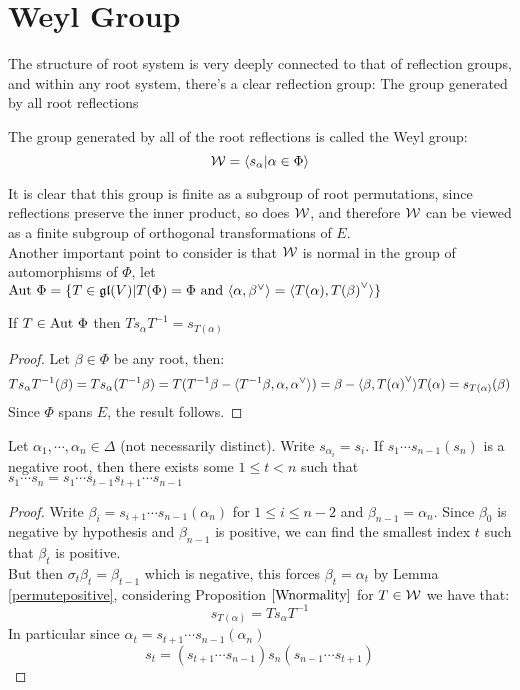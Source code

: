 \section{Weyl Group}
The structure of root system is very deeply connected to that of reflection groups, and within any root system, there's a clear reflection group: The group generated by all root reflections
\begin{defi}
	The group generated by all of the root reflections is called the Weyl group:
	$$ \mathcal{W} = \langle s_\alpha | \alpha \in \Phi\rangle $$
	\label{Wdef}
\end{defi}
It is clear that this group is finite as a subgroup of root permutations, since reflections preserve the inner product, so does $\mathcal{W}$, and therefore $\mathcal{W}$ can be viewed as a finite subgroup of orthogonal transformations of $E$.\\
Another important point to consider is that $\mathcal{W}$ is normal in the group of automorphisms of $\Phi$, let $\text{Aut } \Phi = \{T \in \mathfrak{gl}(V)| T(\Phi)=\Phi \text{ and } \langle {\alpha},{\beta}^\lor\rangle = \langle {T(\alpha)},{T(\beta)}^\lor\rangle\}$
\begin{prop}
	If $T \in \text{Aut } \Phi$ then $Ts_\alpha T^{-1} = s_{T(\alpha)}$
	\label{Wnormality}
\end{prop}
\begin{proof}
	Let $\beta \in \Phi$ be any root, then:
	$$Ts_\alpha T^{-1}(\beta) = Ts_\alpha(T^{-1}\beta) = T(T^{-1}\beta - \langle {T^{-1}\beta,\alpha},{\alpha}^\lor\rangle) = \beta - \langle {\beta},{T(\alpha)}^\lor\rangle T(\alpha) = s_{T(\alpha)}(\beta)$$
	Since $\Phi$ spans $E$, the result follows.
\end{proof}
\begin{lema}
	Let $\alpha_1,\cdots,\alpha_n \in\Delta$ (not necessarily distinct). Write $s_{\alpha_i}=s_i$. If $s_1\cdots s_{n-1}(s_n)$ is a negative root, then there exists some $1\le t<n$ such that $s_1 \cdots s_n = s_1 \cdots s_{t-1}s_{t+1} \cdots s_{n-1}$
\end{lema}
\begin{proof}
	Write $\beta_i = s_{i+1} \cdots s_{n-1}(\alpha_n)$ for $1\le i \le n-2$ and $\beta_{n-1} = \alpha_n$. Since $\beta_0$ is negative by hypothesis and $\beta_{n-1}$ is positive, we can find the smallest index $t$ such that $\beta_t$ is positive.\\
	But then $\sigma_t{\beta_t} = \beta_{t-1}$ which is negative, this forces $\beta_t = \alpha_t$ by Lemma \ref{permutepositive}, considering Proposition $\ref{Wnormality}$ for $T \in \mathcal{W}$ we have that:
	$$s_{T(\alpha)} = Ts_\alpha T^{-1}$$ 
	In particular since $\alpha_t = s_{t+1}\cdots s_{n-1}(\alpha_n)$
	$$s_t =  (s_{t+1}\cdots s_{n-1}) s_n (s_{n-1}\cdots s_{t+1})$$
\end{proof}
